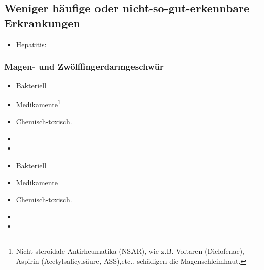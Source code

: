 % 
% 
% 
% 




\subsection{Weniger häufige oder nicht-so-gut-erkennbare Erkrankungen}


\begin{itemize}
    \item Hepatitis: 
\end{itemize}




\subsubsection{Magen- und Zwölffingerdarmgeschwür}



{
\begin{itemize}
    \item Bakteriell 
    \item Medikamente\footnote{Nicht-steroidale Antirheumatika (NSAR), wie z.B.
    Voltaren{\texttrademark} (Diclofenac), Aspirin{\texttrademark}
    (Acetylsalicylsäure, ASS),etc., schädigen die Magenschleimhaut.}
    \item Chemisch-toxisch.
    \item {}
    \item {}
\end{itemize}
}{
\begin{itemize}
    \item Bakteriell 
    \item Medikamente
    \item Chemisch-toxisch.
    \item {}
    \item {}
\end{itemize}
}{}{}{}

